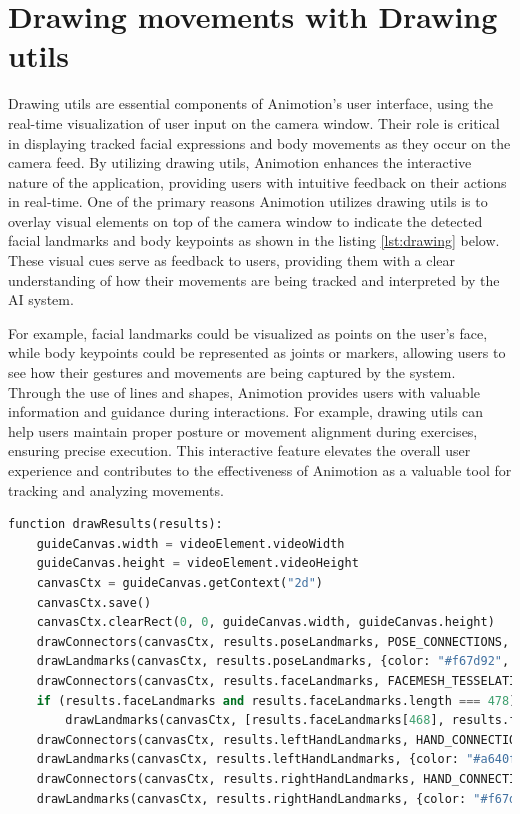 \section{Drawing movements with Drawing utils}
Drawing utils are essential components of Animotion's user interface, using the real-time visualization of user 
input on the camera window. Their role is critical in displaying tracked facial expressions and body movements as 
they occur on the camera feed. By utilizing drawing utils, Animotion enhances the interactive nature of the 
application, providing users with intuitive feedback on their actions in real-time.
One of the primary reasons Animotion utilizes drawing utils is to overlay visual elements on top of the camera window to 
indicate the detected facial landmarks and body keypoints as shown in the listing \ref{lst:drawing} below. These visual cues serve as feedback to users, 
providing them with a clear understanding of how their movements are being tracked and interpreted by the AI system. 

For example, facial landmarks could be visualized as points on the user's face, while body keypoints could be 
represented as joints or markers, allowing users to see how their gestures and movements are being captured by the system.
Through the use of lines and shapes, Animotion provides users with valuable information and guidance during interactions. 
For example, drawing utils can help users maintain proper posture or movement alignment during exercises, ensuring precise execution. 
This interactive feature elevates the overall user experience and contributes to the effectiveness of 
Animotion as a valuable tool for tracking and analyzing movements. \cite{drawingutils}

\begin{lstlisting}[language=Python,caption=Setting the landmarks on the camera feed,label=lst:drawing]
  function drawResults(results):
    guideCanvas.width = videoElement.videoWidth
    guideCanvas.height = videoElement.videoHeight
    canvasCtx = guideCanvas.getContext("2d")
    canvasCtx.save()
    canvasCtx.clearRect(0, 0, guideCanvas.width, guideCanvas.height)
    drawConnectors(canvasCtx, results.poseLandmarks, POSE_CONNECTIONS, {color: "#a640ff", lineWidth: 4})
    drawLandmarks(canvasCtx, results.poseLandmarks, {color: "#f67d92", lineWidth: 2})
    drawConnectors(canvasCtx, results.faceLandmarks, FACEMESH_TESSELATION, {color: "#fcd4db", lineWidth: 1})
    if (results.faceLandmarks and results.faceLandmarks.length === 478):
        drawLandmarks(canvasCtx, [results.faceLandmarks[468], results.faceLandmarks[468 + 5]], {color: "#fcd4db", lineWidth: 2})
    drawConnectors(canvasCtx, results.leftHandLandmarks, HAND_CONNECTIONS, {color: "#FF1493", lineWidth: 5})
    drawLandmarks(canvasCtx, results.leftHandLandmarks, {color: "#a640ff", lineWidth: 2})
    drawConnectors(canvasCtx, results.rightHandLandmarks, HAND_CONNECTIONS, {color: "#a640ff", lineWidth: 5})
    drawLandmarks(canvasCtx, results.rightHandLandmarks, {color: "#f67d92", lineWidth: 2})
\end{lstlisting}

